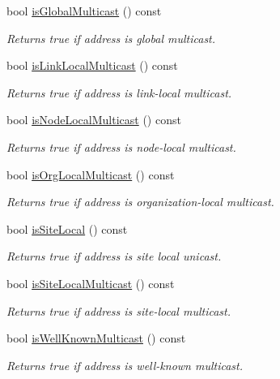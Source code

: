 \begin{DoxyCompactItemize}
bool \hyperlink{classlibrary_1_1io_1_1ip_1_1_address_a5e6c384bba26c666b0922be94c41eb0c}{is\+Global\+Multicast} () const
\begin{DoxyCompactList}\small\item\em Returns true if address is global multicast. \end{DoxyCompactList}\item 
bool \hyperlink{classlibrary_1_1io_1_1ip_1_1_address_a921a8995f53b38385f17d7bc2dd0809a}{is\+Link\+Local\+Multicast} () const
\begin{DoxyCompactList}\small\item\em Returns true if address is link-\/local multicast. \end{DoxyCompactList}\item 
bool \hyperlink{classlibrary_1_1io_1_1ip_1_1_address_ac2991f8db5e979f2f167b56a149bc010}{is\+Node\+Local\+Multicast} () const
\begin{DoxyCompactList}\small\item\em Returns true if address is node-\/local multicast. \end{DoxyCompactList}\item 
bool \hyperlink{classlibrary_1_1io_1_1ip_1_1_address_a3507475aa3a97c63dfe0065eff2307ad}{is\+Org\+Local\+Multicast} () const
\begin{DoxyCompactList}\small\item\em Returns true if address is organization-\/local multicast. \end{DoxyCompactList}\item 
bool \hyperlink{classlibrary_1_1io_1_1ip_1_1_address_aeb2f2c318f7144c1d74c2035be3d4eab}{is\+Site\+Local} () const
\begin{DoxyCompactList}\small\item\em Returns true if address is site local unicast. \end{DoxyCompactList}\item 
bool \hyperlink{classlibrary_1_1io_1_1ip_1_1_address_a14420f343bc580c0689611670cfd1eaa}{is\+Site\+Local\+Multicast} () const
\begin{DoxyCompactList}\small\item\em Returns true if address is site-\/local multicast. \end{DoxyCompactList}\item 
bool \hyperlink{classlibrary_1_1io_1_1ip_1_1_address_a4720a52b340f77fcecab4963a6e773b5}{is\+Well\+Known\+Multicast} () const
\begin{DoxyCompactList}\small\item\em Returns true if address is well-\/known multicast. \end{DoxyCompactList}\item 

\end{DoxyCompactItemize}
